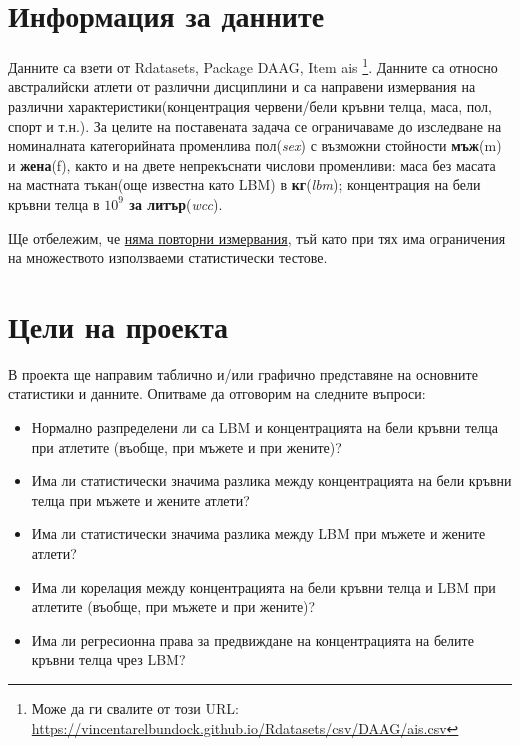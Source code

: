 \documentclass[12pt]{article} %
\begin{document}
\begin{large}

  \tableofcontents{}

  \section{Информация за данните}
  Данните са взети от Rdatasets, Package DAAG, Item ais \footnote{Може да ги свалите от този URL: \url{https://vincentarelbundock.github.io/Rdatasets/csv/DAAG/ais.csv}}. Данните са относно австралийски атлети от различни дисциплини и са направени измервания на различни характеристики(концентрация червени/бели кръвни телца, маса, пол, спорт и т.н.). За целите на поставената задача се ограничаваме до изследване на номиналната категорийната променлива пол(\textit{sex}) с възможни стойности \textbf{мъж}(m) и \textbf{жена}(f), както и на двете непрекъснати числови променливи: маса без масата на мастната тъкан(още известна като LBM) в \textbf{кг}(\textit{lbm}); концентрация на бели кръвни телца в \textbf{$10^9$ за литър}(\textit{wcc}). \par
  Ще отбележим, че \uline{няма повторни измервания}, тъй като при тях има ограничения на множеството използваеми статистически тестове.

  \section{Цели на проекта}

  В проекта ще направим таблично и/или графично представяне на основните статистики и данните. Опитваме да отговорим на следните въпроси:

  \begin{itemize}
    \item Нормално разпределени ли са LBM и концентрацията на бели кръвни телца при атлетите (въобще, при мъжете и при жените)?
    \item Има ли статистически значима разлика между концентрацията на бели кръвни телца при мъжете и жените атлети?
    \item Има ли статистически значима разлика между LBM при мъжете и жените атлети?
    \item Има ли корелация между концентрацията на бели кръвни телца и LBM при атлетите (въобще, при мъжете и при жените)?
    \item Има ли регресионна права за предвиждане на концентрацията на белите кръвни телца чрез LBM?
  \end{itemize}


\end{large}
\end{document}
